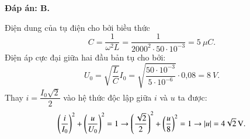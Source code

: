\begin{enumerate}[label=\bfseries Câu \arabic*:]
	\hideall
	{		\textbf{Đáp án: B.}
		
		Điện dung của tụ điện cho bởi biều thức
		$$
		C=\dfrac{1}{\omega^{2} L}=\dfrac{1}{2000^{2} \cdot 50\cdot10^{-3}}= \SI{5}{\mu C}.
		$$
		Điện áp cực đại giữa hai đầu bản tụ cho bởi:
		$$
		U_{0}=\sqrt{\dfrac{L}{C}} I_{0}=\sqrt{\dfrac{50\cdot10^{-3}}{5\cdot10^{-6}}} \cdot \text{0,08}= \SI{8}{V}.
		$$
		Thay $i=\dfrac{I_{0} \sqrt{2}}{2}$ vào hệ thức độc lập giữa $i$ và $u$ ta được:
		$$
		\left(\dfrac{i}{I_{0}}\right)^{2}+\left(\dfrac{u}{U_{0}}\right)^{2}=1 \rightarrow\left(\dfrac{\sqrt{2}}{2}\right)^{2}+\left(\dfrac{u}{8}\right)^{2}=1 \rightarrow|u|= \xsi{4\sqrt{2}}{V}.
		$$
		
	}
	
\end{enumerate}

